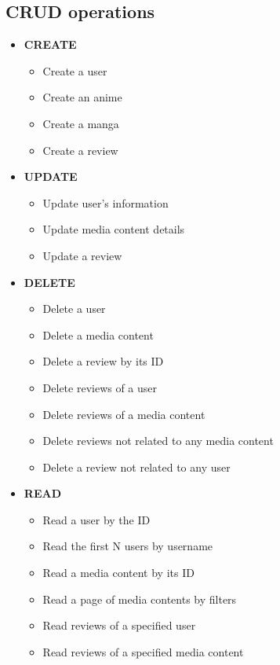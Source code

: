 \subsection*{CRUD operations}
\begin{itemize}
  \item \textbf{CREATE}
  \begin{itemize}
      \item Create a user
      \item Create an anime
      \item Create a manga
      \item Create a review
  \end{itemize}

  \item \textbf{UPDATE}
  \begin{itemize}
      \item Update user's information
      \item Update media content details
      \item Update a review
  \end{itemize}

  \item \textbf{DELETE}
  \begin{itemize}
      \item Delete a user
      \item Delete a media content
      \item Delete a review by its ID 
      \item Delete reviews of a user
      \item Delete reviews of a media content
      \item Delete reviews not related to any media content
      \item Delete a review not related to any user
  \end{itemize}

  \item \textbf{READ}
  \begin{itemize}
      \item Read a user by the ID
      \item Read the first N users by username
      \item Read a media content by its ID
      \item Read a page of media contents by filters
      \item Read reviews of a specified user
      \item Read reviews of a specified media content
  \end{itemize}
\end{itemize}

